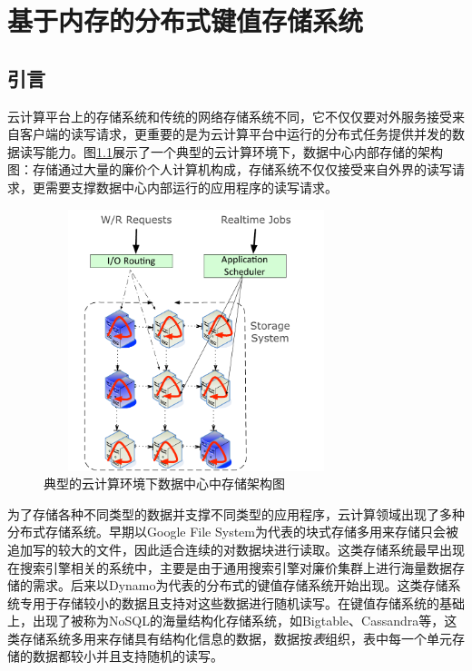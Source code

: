 \chapter{基于内存的分布式键值存储系统}
\label{chapter:sedna}

\section{引言}
云计算平台上的存储系统和传统的网络存储系统不同，它不仅仅要对外服务接受来自客户端的读写请求，更重要的是为云计算平台中运行的分布式任务提供并发的数据读写能力。图\ref{fig:app}展示了一个典型的云计算环境下，数据中心内部存储的架构图：存储通过大量的廉价个人计算机构成，存储系统不仅仅接受来自外界的读写请求，更需要支撑数据中心内部运行的应用程序的读写请求。

\begin{figure}[h!]
\centering
\includegraphics[height=3in, width=3.5in]{../figures/app.pdf}
\caption{典型的云计算环境下数据中心中存储架构图}
\label{fig:app}
\end{figure}

为了存储各种不同类型的数据并支撑不同类型的应用程序，云计算领域出现了多种分布式存储系统。早期以Google File System\cite{Ghemawat2003}为代表的块式存储多用来存储只会被追加写的较大的文件，因此适合连续的对数据块进行读取。这类存储系统最早出现在搜索引擎相关的系统中，主要是由于通用搜索引擎对廉价集群上进行海量数据存储的需求。后来以Dynamo\cite{decandia2007dynamo}为代表的分布式的键值存储系统开始出现。这类存储系统专用于存储较小的数据且支持对这些数据进行随机读写。在键值存储系统的基础上，出现了被称为NoSQL\cite{nosqldatabase}的海量结构化存储系统，如Bigtable\cite{chang2008bigtable}、Cassandra\cite{lakshman2010cassandra}等，这类存储系统多用来存储具有结构化信息的数据，数据按\textit{表}组织，表中每一个单元存储的数据都较小并且支持随机的读写。

